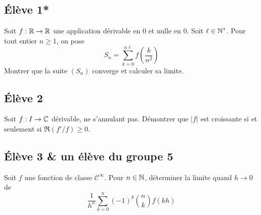 \documentclass[10pt]{scrartcl}
\title{}
\author{}
\date{}
\begin{document}
    \subsection*{Élève 1*}
    \begin{exo}
        Soit $f:\operatorname{\mathbb R}\to\operatorname{\mathbb R}$ une application dérivable en $0$ et nulle en $0$. 
        Soit $\ell\in\operatorname{\mathbb N}^*$. Pour tout entier $n\geq 1$, on pose 
        \[
            S_n=\sum_{k=0}^{n\ell}f\left(\frac k{n^2}\right)
        \]
        Montrer que la suite $(S_n)$ converge et calculer sa limite.
    \end{exo}
    
    \subsection*{Élève 2}
    \begin{exo}
        Soit $f:I\to\operatorname{\mathbb C}$ dérivable, ne s'annulant pas. 
        Démontrer que $|f|$ est croissante si et seulement si 
        $\Re(f'/f)\geq 0$.
    \end{exo}

    \subsection*{Élève 3 \& un élève du groupe 5}
    \begin{exo}
        Soit $f$ une fonction de classe $\mathcal C^\infty$.
        Pour $n\in\operatorname{\mathbb N}$, déterminer la limite quand $h\to0$ de 
        \[
            \frac1{h^n}\sum_{k=0}^n(-1)^k\binom nkf(kh)
        \]
    \end{exo}
\end{document}
